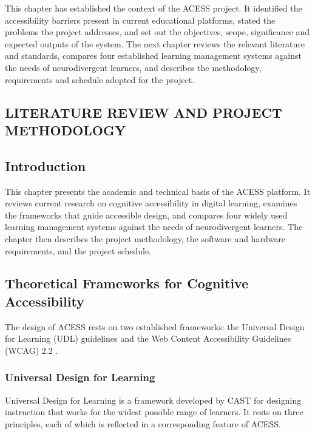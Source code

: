 \documentclass[12pt, oneside]{article} %
\begin{document}
This chapter has established the context of the ACESS project. It identified the accessibility barriers present in current educational platforms, stated the problems the project addresses, and set out the objectives, scope, significance and expected outputs of the system. The next chapter reviews the relevant literature and standards, compares four established learning management systems against the needs of neurodivergent learners, and describes the methodology, requirements and schedule adopted for the project.



\newpage
\vfill \null
\thispagestyle{empty}
\begin{center}
\section{LITERATURE REVIEW AND PROJECT METHODOLOGY}
\end{center}
\vspace{2cm}

\subsection{Introduction}

This chapter presents the academic and technical basis of the ACESS platform. It reviews current research on cognitive accessibility in digital learning, examines the frameworks that guide accessible design, and compares four widely used learning management systems against the needs of neurodivergent learners. The chapter then describes the project methodology, the software and hardware requirements, and the project schedule.

\subsection{Theoretical Frameworks for Cognitive Accessibility}

The design of ACESS rests on two established frameworks: the Universal Design for Learning (UDL) guidelines \cite{udl_guidelines} and the Web Content Accessibility Guidelines (WCAG) 2.2 \cite{wcag22}.

\subsubsection{Universal Design for Learning}
Universal Design for Learning is a framework developed by CAST \cite{udl_guidelines} for designing instruction that works for the widest possible range of learners. It rests on three principles, each of which is reflected in a corresponding feature of ACESS.
\end{document}
